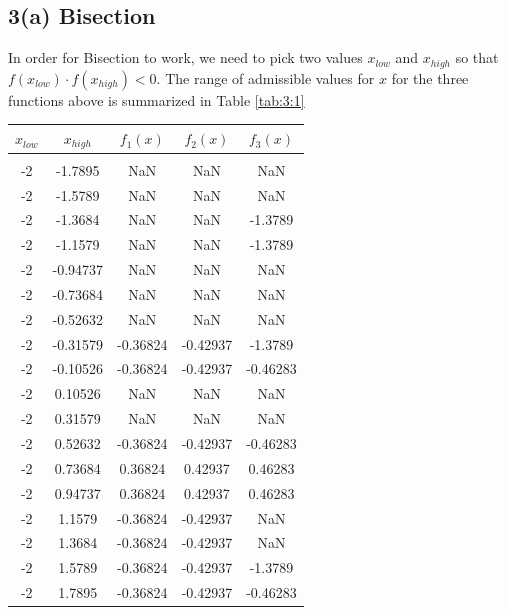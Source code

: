 \documentclass[11pt]{article}
\newcommand{\1}{\mathbbm{1}}
\begin{document}
\subsection*{3(a) Bisection}
In order for Bisection to work, we need to pick two values $x_{low}$ and $x_{high}$ so that $f(x_{low})\cdot f(x_{high})<0$. The range of admissible values for $x$ for the three functions above is summarized in Table \ref{tab:3:1}
	\begin{table}[h]
	\centering
	\begin{tabular}{c c c c c }
		\hline
		\hline
		   $x_{low}$   &  $x_{high}$  &  $f_{1}(x)$ &   $f_{2}(x)$  &  $f_{3}(x)$\\
		\hline                                                        
		&            &           &             &          \\
		-2  &   -1.7895  &       NaN &        NaN  &       NaN\\
		-2  &   -1.5789  &       NaN &        NaN  &       NaN\\
		-2  &   -1.3684  &       NaN &        NaN  &   -1.3789\\
		-2  &   -1.1579  &       NaN &        NaN  &   -1.3789\\
		-2  &  -0.94737  &       NaN &        NaN  &       NaN\\
		-2  &  -0.73684  &       NaN &        NaN  &       NaN\\
		-2  &  -0.52632  &       NaN &        NaN  &       NaN\\
		-2  &  -0.31579  &  -0.36824 &   -0.42937  &   -1.3789\\
		-2  &  -0.10526  &  -0.36824 &   -0.42937  &  -0.46283\\
		-2  &   0.10526  &       NaN &        NaN  &       NaN\\
		-2  &   0.31579  &       NaN &        NaN  &       NaN\\
		-2  &   0.52632  &  -0.36824 &   -0.42937  &  -0.46283\\
		-2  &   0.73684  &   0.36824 &    0.42937  &   0.46283\\
		-2  &   0.94737  &   0.36824 &    0.42937  &   0.46283\\
		-2  &    1.1579  &  -0.36824 &   -0.42937  &       NaN\\
		-2  &    1.3684  &  -0.36824 &   -0.42937  &       NaN\\
		-2  &    1.5789  &  -0.36824 &   -0.42937  &   -1.3789\\
		-2  &    1.7895  &  -0.36824 &   -0.42937  &  -0.46283\\

\end{tabular}
\end{table}
\end{document}

